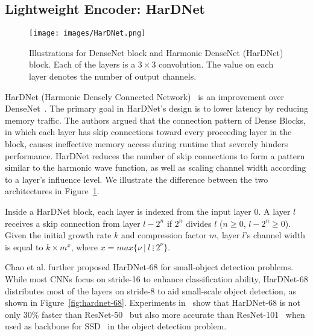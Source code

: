 \documentclass{ieeeaccess}
\begin{document}
\subsection{Lightweight Encoder: HarDNet}

\begin{center}
    \begin{figure}[th]
        \begin{center}
            \texttt{[image: images/HarDNet.png]}
        \end{center}
        \caption{Illustrations for DenseNet block and Harmonic DenseNet (HarDNet) block. Each of the layers is a $3\times3$ convolution. The value on each layer denotes the number of output channels.}
        \label{fig:hardnet}
    \end{figure}
\end{center}

HarDNet (Harmonic Densely Connected Network)~\cite{chao2019hardnet} is an improvement over DenseNet~\cite{huang2017densely}. The primary goal in HarDNet's design is to lower latency by reducing memory traffic. The authors argued that the connection pattern of Dense Blocks, in which each layer has skip connections toward every proceeding layer in the block, causes ineffective memory access during runtime that severely hinders performance. HarDNet reduces the number of skip connections to form a pattern similar to the harmonic wave function, as well as scaling channel width according to a layer's influence level. We illustrate the difference between the two architectures in Figure~\ref{fig:hardnet}.

Inside a HarDNet block, each layer is indexed from the input layer 0. A layer $l$ receives a skip connection from layer $l-2^n$ if $2^n$ divides $l$ ($n \geq 0$, $l-2^n \geq 0$). Given the initial growth rate $k$ and compression factor $m$, layer $l$'s channel width is equal to $k \times m^x$, where $x = max \{\nu \ |\ l\ \vdots\ 2^{\nu} \}$.

Chao et al. \cite{chao2019hardnet} further proposed HarDNet-68 for small-object detection problems. While most CNNs focus on stride-16 to enhance classification ability, HarDNet-68 distributes most of the layers on stride-8 to aid small-scale object detection, as shown in Figure~\ref{fig:hardnet-68}. Experiments in~\cite{chao2019hardnet} show that HarDNet-68 is not only 30\% faster than ResNet-50~\cite{he2016deep} but also more accurate than ResNet-101~\cite{he2016deep} when used as backbone for SSD~\cite{liu2016ssd} in the object detection problem.
\end{document}
